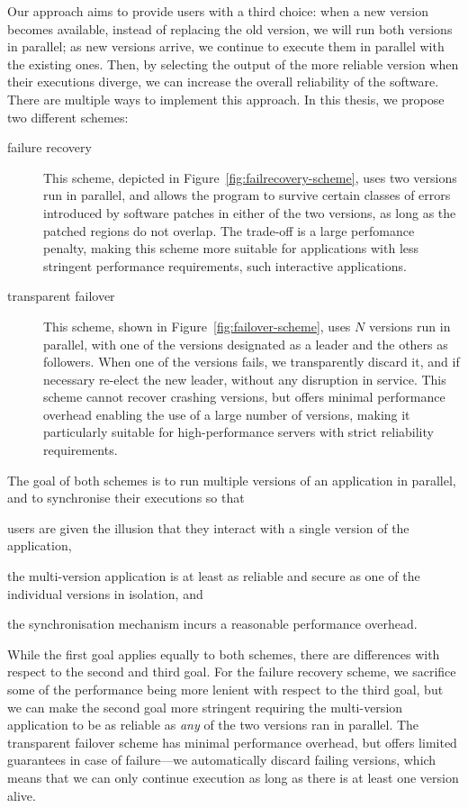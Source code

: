 Our approach aims to provide users with a third choice: when a new version
becomes available, instead of replacing the old version, we will run both
versions in parallel; as new versions arrive, we continue to execute them in
parallel with the existing ones. Then, by selecting the output of the more
reliable version when their executions diverge, we can increase the overall
reliability of the software. There are multiple ways to implement this
approach. In this thesis, we propose two different schemes:%
\begin{description}
\item[failure recovery] This scheme, depicted in
  Figure~\ref{fig:failrecovery-scheme}, uses two versions run in parallel, and
  allows the program to survive certain classes of errors introduced by
  software patches in either of the two versions, as long as the patched
  regions do not overlap. The trade-off is a large perfomance penalty, making
  this scheme more suitable for applications with less stringent performance
  requirements, such interactive applications.
\item[transparent failover] This scheme, shown in
  Figure~\ref{fig:failover-scheme}, uses $N$ versions run in parallel, with one
  of the versions designated as a leader and the others as followers. When one
  of the versions fails, we transparently discard it, and if necessary re-elect
  the new leader, without any disruption in service. This scheme cannot recover
  crashing versions, but offers minimal performance overhead enabling the use
  of a large number of versions, making it particularly suitable for
  high-performance servers with strict reliability requirements.
\end{description}

The goal of both schemes is to run multiple versions of an application in
parallel, and to synchronise their executions so that%
\begin{inparaenum}[(1)]
\item users are given the illusion that they interact with a single version of
  the application,
\item the multi-version application is at least as reliable and secure as one
  of the individual versions in isolation, and
\item the synchronisation mechanism incurs a reasonable performance overhead.
\end{inparaenum}
While the first goal applies equally to both schemes, there are differences
with respect to the second and third goal. For the failure recovery scheme, we
sacrifice some of the performance being more lenient with respect to the third
goal, but we can make the second goal more stringent requiring the
multi-version application to be as reliable as \emph{any} of the two versions
ran in parallel. The transparent failover scheme has minimal performance
overhead, but offers limited guarantees in case of failure---we automatically
discard failing versions, which means that we can only continue execution as
long as there is at least one version alive.

